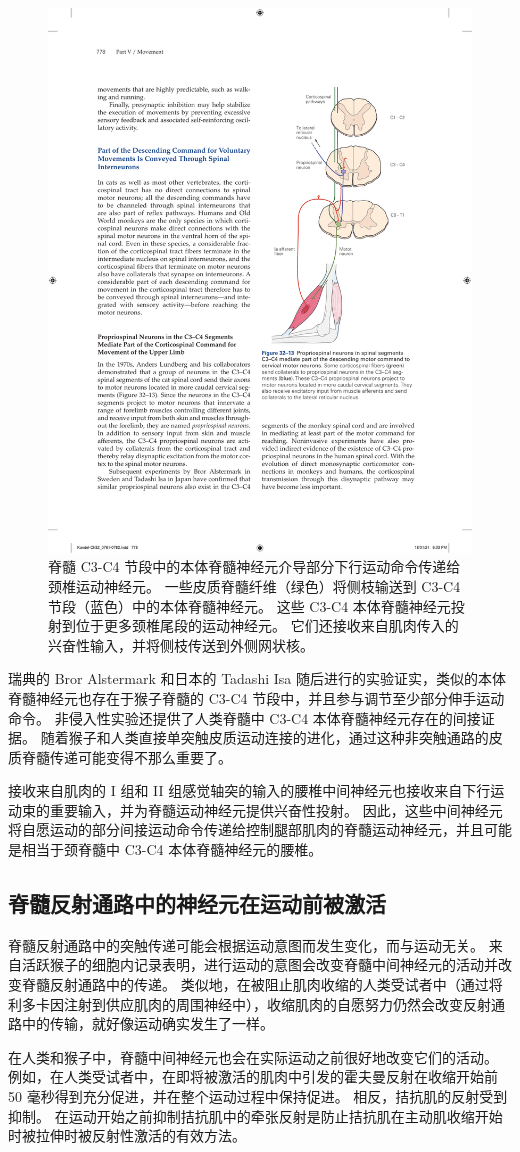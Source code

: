 \begin{figure}[htbp]
	\centering
	\includegraphics[width=0.5\linewidth]{chap32/fig_32_13}
	\caption{脊髓 C3-C4 节段中的本体脊髓神经元介导部分下行运动命令传递给颈椎运动神经元。 一些皮质脊髓纤维（绿色）将侧枝输送到 C3-C4 节段（蓝色）中的本体脊髓神经元。 这些 C3-C4 本体脊髓神经元投射到位于更多颈椎尾段的运动神经元。 它们还接收来自肌肉传入的兴奋性输入，并将侧枝传送到外侧网状核。}
	\label{fig:32_13}
\end{figure}


瑞典的 Bror Alstermark 和日本的 Tadashi Isa 随后进行的实验证实，类似的本体脊髓神经元也存在于猴子脊髓的 C3-C4 节段中，并且参与调节至少部分伸手运动命令。 非侵入性实验还提供了人类脊髓中 C3-C4 本体脊髓神经元存在的间接证据。 随着猴子和人类直接单突触皮质运动连接的进化，通过这种非突触通路的皮质脊髓传递可能变得不那么重要了。

接收来自肌肉的 I 组和 II 组感觉轴突的输入的腰椎中间神经元也接收来自下行运动束的重要输入，并为脊髓运动神经元提供兴奋性投射。 因此，这些中间神经元将自愿运动的部分间接运动命令传递给控制腿部肌肉的脊髓运动神经元，并且可能是相当于颈脊髓中 C3-C4 本体脊髓神经元的腰椎。

\subsection{脊髓反射通路中的神经元在运动前被激活}
脊髓反射通路中的突触传递可能会根据运动意图而发生变化，而与运动无关。 来自活跃猴子的细胞内记录表明，进行运动的意图会改变脊髓中间神经元的活动并改变脊髓反射通路中的传递。 类似地，在被阻止肌肉收缩的人类受试者中（通过将利多卡因注射到供应肌肉的周围神经中），收缩肌肉的自愿努力仍然会改变反射通路中的传输，就好像运动确实发生了一样。

在人类和猴子中，脊髓中间神经元也会在实际运动之前很好地改变它们的活动。 例如，在人类受试者中，在即将被激活的肌肉中引发的霍夫曼反射在收缩开始前 50 毫秒得到充分促进，并在整个运动过程中保持促进。 相反，拮抗肌的反射受到抑制。 在运动开始之前抑制拮抗肌中的牵张反射是防止拮抗肌在主动肌收缩开始时被拉伸时被反射性激活的有效方法。

